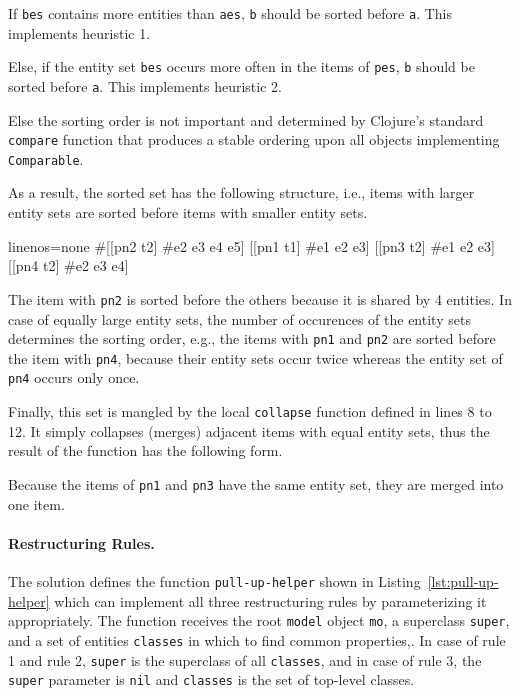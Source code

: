 \documentclass[submission]{eptcs}
\begin{document}
\begin{compactenum}
\item If \verb|bes| contains more entities than \verb|aes|, \verb|b| should be
  sorted before \verb|a|.  This implements heuristic 1.
\item Else, if the entity set \verb|bes| occurs more often in the items of
  \verb|pes|, \verb|b| should be sorted before \verb|a|.  This implements
  heuristic 2.
\item Else the sorting order is not important and determined by Clojure's
  standard \verb|compare| function that produces a stable ordering upon all
  objects implementing \verb|Comparable|.
\end{compactenum}

As a result, the sorted set has the following structure, i.e., items with
larger entity sets are sorted before items with smaller entity sets.

\begin{clojurecode*}{linenos=none}
#{[[pn2 t2] #{e2 e3 e4 e5}]  [[pn1 t1] #{e1 e2 e3}]
  [[pn3 t2] #{e1 e2 e3}]     [[pn4 t2] #{e2 e3 e4}]}
\end{clojurecode*}

The item with \verb|pn2| is sorted before the others because it is shared by 4
entities.  In case of equally large entity sets, the number of occurences of
the entity sets determines the sorting order, e.g., the items with \verb|pn1|
and \verb|pn2| are sorted before the item with \verb|pn4|, because their entity
sets occur twice whereas the entity set of \verb|pn4| occurs only once.

Finally, this set is mangled by the local \verb|collapse| function defined in
lines 8 to 12.  It simply collapses (merges) adjacent items with equal entity
sets, thus the result of the function has the following form.

\begin{clojurecode*}{linenos=none}
([([pn2 t2])          #{e2 e3 e4 e5}]
 [([pn1 t1] [pn3 t2]) #{e1 e2 e3}]
 [([pn4 t2])          #{e2 e3 e4}]}
\end{clojurecode*}

Because the items of \verb|pn1| and \verb|pn3| have the same entity set, they
are merged into one item.


\paragraph{Restructuring Rules.}

The solution defines the function \verb|pull-up-helper| shown in
Listing~\ref{lst:pull-up-helper} which can implement all three restructuring
rules by parameterizing it appropriately.  The function receives the root
\verb|model| object \verb|mo|, a superclass \verb|super|, and a set of entities
\verb|classes| in which to find common properties,.  In case of rule 1 and rule
2, \verb|super| is the superclass of all \verb|classes|, and in case of rule 3,
the \verb|super| parameter is \verb|nil| and \verb|classes| is the set of
top-level classes.
\end{document}
